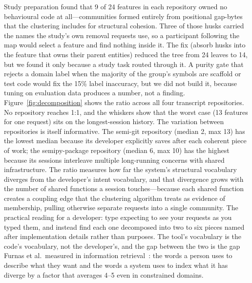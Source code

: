 Study preparation found that 9 of 24 features in each repository owned no
behavioural code at all---communities formed entirely from positional gap-bytes
that the clustering includes for structural cohesion. Three of those husks
carried the names the study's own removal requests use, so a participant following
the map would select a feature and find nothing inside it. The fix (absorb husks
into the feature that owns their parent entities) reduced the tree from 24 leaves
to 14, but we found it only because a study task routed through it. A purity
gate that rejects a domain label when the majority of the group's symbols are
scaffold or test code would fix the 15\% label inaccuracy, but we did not build
it, because tuning on evaluation data produces a number, not a finding.
Figure~\ref{fig:decomposition} shows the ratio across all four transcript
repositories. No repository reaches 1:1, and the whiskers show that the worst
case (13 features for one request) sits on the longest-session history. The
variation between repositories is itself informative. The semi-git repository
(median 2, max 13) has the lowest median because its developer explicitly saves
after each coherent piece of work; the semipy-package repository (median 6, max
10) has the highest because its sessions interleave multiple long-running
concerns with shared infrastructure. The ratio measures how far the system's
structural vocabulary diverges from the developer's intent vocabulary, and that
divergence grows with the number of shared functions a session touches---because
each shared function creates a coupling edge that the clustering algorithm
treats as evidence of membership, pulling otherwise separate requests into a
single community. The practical reading for a developer: type 
expecting to see your requests as you typed them, and instead find each one
decomposed into two to six pieces named after implementation details rather than
purposes. The tool's vocabulary is the code's vocabulary, not the developer's,
and the gap between the two is the gap Furnas et al.\ measured in information
retrieval~\cite{furnas1987}: the words a person uses to describe what they want
and the words a system uses to index what it has diverge by a factor that
averages 4--5 even in constrained domains.

